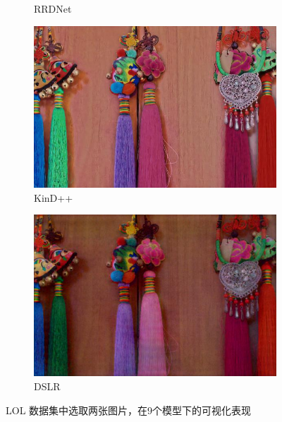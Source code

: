 \documentclass[a4paper, 10pt]{article}
\begin{document}
\begin{figure}[htb]
\begin{subfigure}{0.19\textwidth}
				\captionsetup{font=scriptsize}
				\caption{RRDNet}
				\label{fig: RRDNet1}
			\end{subfigure}
			\begin{subfigure}{0.19\textwidth}
				\includegraphics[width=\linewidth]{picture/LLIE/Experiment/KinD++1}
				\captionsetup{font=scriptsize}
				\caption{KinD++}
				\label{fig: KinD++1}	
			\end{subfigure}
			\begin{subfigure}{0.19\textwidth}
				\includegraphics[width=\linewidth]{picture/LLIE/Experiment/DSLR1}
				\captionsetup{font=scriptsize}
				\caption{DSLR}
				\label{fig: DSLR1}	
			\end{subfigure}
			\caption{
				\label{fig: Experiment}
				LOL 数据集中选取两张图片，在9个模型下的可视化表现
			}
		\end{figure}
		
	
		\renewcommand{\refname}{References}
		
\end{document}
